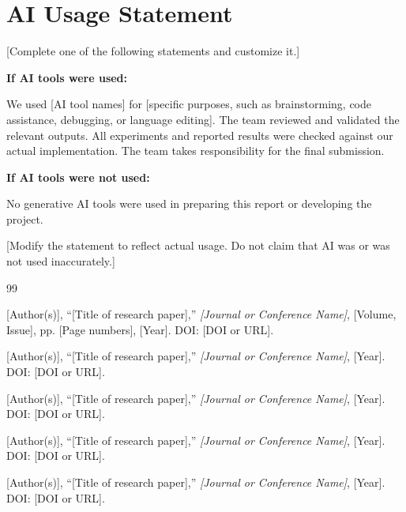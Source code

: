 \documentclass[12pt,a4paper]{report}
\begin{document}
\section{AI Usage Statement}

[Complete one of the following statements and customize it.]

\textbf{If AI tools were used:}

We used [AI tool names] for [specific purposes, such as
brainstorming, code assistance, debugging, or language editing].
The team reviewed and validated the relevant outputs.
All experiments and reported results were checked against
our actual implementation. The team takes responsibility
for the final submission.

\textbf{If AI tools were not used:}

No generative AI tools were used in preparing this report
or developing the project.

[Modify the statement to reflect actual usage. Do not
claim that AI was or was not used inaccurately.]

\begin{thebibliography}{99}

[Author(s)], ``[Title of research paper],''
\textit{[Journal or Conference Name]}, [Volume, Issue],
pp. [Page numbers], [Year].
DOI: [DOI or URL].

[Author(s)], ``[Title of research paper],''
\textit{[Journal or Conference Name]}, [Year].
DOI: [DOI or URL].

[Author(s)], ``[Title of research paper],''
\textit{[Journal or Conference Name]}, [Year].
DOI: [DOI or URL].

[Author(s)], ``[Title of research paper],''
\textit{[Journal or Conference Name]}, [Year].
DOI: [DOI or URL].

[Author(s)], ``[Title of research paper],''
\textit{[Journal or Conference Name]}, [Year].
DOI: [DOI or URL].

\end{thebibliography}
\end{document}
